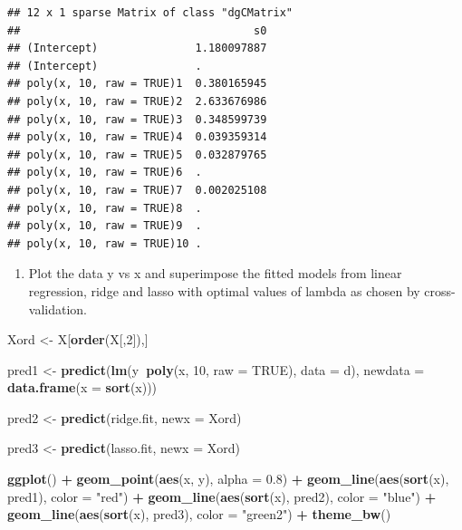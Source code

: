 \documentclass[]{article}
\newenvironment{Shaded}{\begin{snugshade}}{\end{snugshade}}
\newcommand{\DataTypeTok}[1]{\textcolor[rgb]{0.13,0.29,0.53}{#1}}
\newcommand{\DecValTok}[1]{\textcolor[rgb]{0.00,0.00,0.81}{#1}}
\newcommand{\FloatTok}[1]{\textcolor[rgb]{0.00,0.00,0.81}{#1}}
\newcommand{\KeywordTok}[1]{\textcolor[rgb]{0.13,0.29,0.53}{\textbf{#1}}}
\newcommand{\NormalTok}[1]{#1}
\newcommand{\OperatorTok}[1]{\textcolor[rgb]{0.81,0.36,0.00}{\textbf{#1}}}
\newcommand{\OtherTok}[1]{\textcolor[rgb]{0.56,0.35,0.01}{#1}}
\newcommand{\StringTok}[1]{\textcolor[rgb]{0.31,0.60,0.02}{#1}}
\providecommand{\tightlist}{%
  \setlength{\itemsep}{0pt}\setlength{\parskip}{0pt}}
\begin{document}
\begin{verbatim}
## 12 x 1 sparse Matrix of class "dgCMatrix"
##                                    s0
## (Intercept)               1.180097887
## (Intercept)               .          
## poly(x, 10, raw = TRUE)1  0.380165945
## poly(x, 10, raw = TRUE)2  2.633676986
## poly(x, 10, raw = TRUE)3  0.348599739
## poly(x, 10, raw = TRUE)4  0.039359314
## poly(x, 10, raw = TRUE)5  0.032879765
## poly(x, 10, raw = TRUE)6  .          
## poly(x, 10, raw = TRUE)7  0.002025108
## poly(x, 10, raw = TRUE)8  .          
## poly(x, 10, raw = TRUE)9  .          
## poly(x, 10, raw = TRUE)10 .
\end{verbatim}

\begin{enumerate}
\def\labelenumi{(\alph{enumi})}
\setcounter{enumi}{3}
\tightlist
\item
  Plot the data y vs x and superimpose the fitted models from linear
  regression, ridge and lasso with optimal values of lambda as chosen by
  cross-validation.
\end{enumerate}

\begin{Shaded}
\begin{Highlighting}[]
\NormalTok{Xord <-}\StringTok{ }\NormalTok{X[}\KeywordTok{order}\NormalTok{(X[,}\DecValTok{2}\NormalTok{]),]}

\NormalTok{pred1 <-}\StringTok{ }\KeywordTok{predict}\NormalTok{(}\KeywordTok{lm}\NormalTok{(y}\OperatorTok{~}\KeywordTok{poly}\NormalTok{(x, }\DecValTok{10}\NormalTok{, }\DataTypeTok{raw =} \OtherTok{TRUE}\NormalTok{), }\DataTypeTok{data =}\NormalTok{ d), }
                \DataTypeTok{newdata =} \KeywordTok{data.frame}\NormalTok{(}\DataTypeTok{x =} \KeywordTok{sort}\NormalTok{(x)))}

\NormalTok{pred2 <-}\StringTok{ }\KeywordTok{predict}\NormalTok{(ridge.fit, }\DataTypeTok{newx =}\NormalTok{ Xord)}

\NormalTok{pred3 <-}\StringTok{ }\KeywordTok{predict}\NormalTok{(lasso.fit, }\DataTypeTok{newx =}\NormalTok{ Xord)}

\KeywordTok{ggplot}\NormalTok{() }\OperatorTok{+}
\StringTok{  }\KeywordTok{geom_point}\NormalTok{(}\KeywordTok{aes}\NormalTok{(x, y), }\DataTypeTok{alpha =} \FloatTok{0.8}\NormalTok{) }\OperatorTok{+}
\StringTok{  }\KeywordTok{geom_line}\NormalTok{(}\KeywordTok{aes}\NormalTok{(}\KeywordTok{sort}\NormalTok{(x), pred1), }\DataTypeTok{color =} \StringTok{"red"}\NormalTok{) }\OperatorTok{+}
\StringTok{  }\KeywordTok{geom_line}\NormalTok{(}\KeywordTok{aes}\NormalTok{(}\KeywordTok{sort}\NormalTok{(x), pred2), }\DataTypeTok{color =} \StringTok{"blue"}\NormalTok{) }\OperatorTok{+}
\StringTok{  }\KeywordTok{geom_line}\NormalTok{(}\KeywordTok{aes}\NormalTok{(}\KeywordTok{sort}\NormalTok{(x), pred3), }\DataTypeTok{color =} \StringTok{"green2"}\NormalTok{) }\OperatorTok{+}
\StringTok{  }\KeywordTok{theme_bw}\NormalTok{()}
\end{Highlighting}
\end{Shaded}
\end{document}
